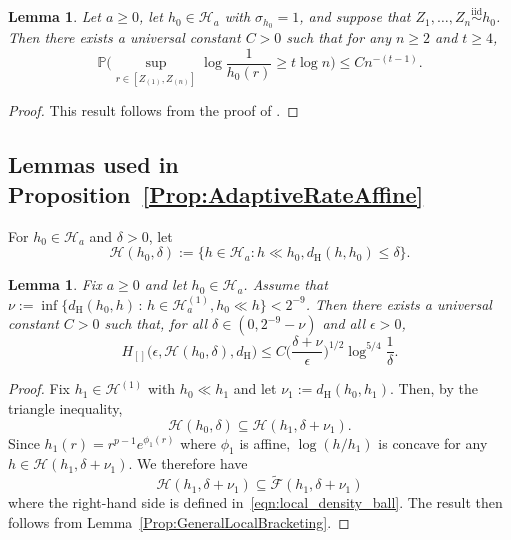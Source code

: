 \documentclass[a4paper,12pt]{article}
\newtheorem{lemma}[theorem]{Lemma}
\begin{document}
\begin{lemma} 
  \label{Lem:ExtremeEventControl2}
Let $a \geq 0$, let $h_0 \in \mathcal{H}_{a}$ with $\sigma_{h_0}=1$, and suppose that $Z_1,\ldots,Z_n \stackrel{\mathrm{iid}}{\sim} h_0$. Then there exists a universal constant $C > 0$ such that for any $n \geq 2$ and $t \geq 4$,
  \[
\mathbb{P}\biggl(\sup_{r \in [Z_{(1)}, Z_{(n)}]} \log \frac{1}{h_0(r)} \geq t \log n\biggr) \leq Cn^{-(t-1)}.
  \]
\end{lemma}
\begin{proof}
This result follows from the proof of \citet[][Lemma~2]{kim2016adaptationsupp}.
\end{proof}

\subsection{Lemmas used in Proposition~\ref{Prop:AdaptiveRateAffine}}

\label{Sec:LocalBrackets}
 
For $h_0 \in \mathcal{H}_a$ and $\delta > 0$, let 
\[
  \mathcal{H}(h_0, \delta) := \bigl\{ h \in \mathcal{H}_a : h \ll h_0, d_{\mathrm{H}}(h,h_0) \leq \delta \bigr\}.
\]
\begin{lemma}
  \label{Lem:LocalBracketing}
  Fix $a \geq 0$ and let $h_0 \in \mathcal{H}_{a}$. Assume that $\nu := \inf \{ d_{\mathrm{H}}(h_0, h) \,:\, h \in \mathcal{H}_{a}^{(1)}, h_0 \ll h \} < 2^{-9}$. Then there exists a universal constant $C > 0$ such that, for all $\delta \in (0, 2^{-9} - \nu)$ and all $\epsilon > 0$,
  \[
    H_{[]}\bigl(\epsilon, \mathcal{H}(h_0, \delta), d_{\mathrm{H}}\bigr) \leq
    C \biggl( \frac{\delta + \nu}{\epsilon} \biggr)^{1/2} \log^{5/4} \frac{1}{\delta}.
  \]
\end{lemma}
\begin{proof}
Fix $h_1 \in \mathcal{H}^{(1)}$ with $h_0 \ll h_1$ and let $\nu_1 := d_{\mathrm{H}}(h_0, h_1)$.  Then, by the triangle inequality,
  \[
    \mathcal{H}(h_0, \delta) \subseteq \mathcal{H}(h_1, \delta + \nu_1).
  \]
Since $h_1(r) = r^{p-1} e^{\phi_1(r)}$ where $\phi_1$ is affine, $ \log (h/h_1)$ is concave for any $h \in  \mathcal{H}(h_1, \delta + \nu_1)$. We therefore have
  \[
    \mathcal{H}(h_1, \delta + \nu_1) \subseteq \tilde{\mathcal{F}}(h_1, \delta + \nu_1)
  \]
  where the right-hand side is defined in~\eqref{eqn:local_density_ball}. The result then follows from Lemma~\ref{Prop:GeneralLocalBracketing}.
\end{proof}
\end{document}
